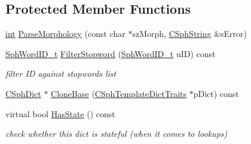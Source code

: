 \subsection*{Protected Member Functions}
\begin{DoxyCompactItemize}
\item 
\hyperlink{sphinxexpr_8cpp_a4a26e8f9cb8b736e0c4cbf4d16de985e}{int} \hyperlink{structCSphTemplateDictTraits_a12ea1c20cfb80f68c8b7248cefb35e87}{Parse\-Morphology} (const char $\ast$sz\-Morph, \hyperlink{structCSphString}{C\-Sph\-String} \&s\-Error)
\item 
\hyperlink{sphinx_8h_a80a94d5984fdf9214a98f3e5e65df963}{Sph\-Word\-I\-D\-\_\-t} \hyperlink{structCSphTemplateDictTraits_a7ab6a1ebada56d16ba82ab3b3cf73cf3}{Filter\-Stopword} (\hyperlink{sphinx_8h_a80a94d5984fdf9214a98f3e5e65df963}{Sph\-Word\-I\-D\-\_\-t} u\-I\-D) const 
\begin{DoxyCompactList}\small\item\em filter I\-D against stopwords list \end{DoxyCompactList}\item 
\hyperlink{classCSphDict}{C\-Sph\-Dict} $\ast$ \hyperlink{structCSphTemplateDictTraits_a3131b3a5d888aa0107c639d32b9d9d51}{Clone\-Base} (\hyperlink{structCSphTemplateDictTraits}{C\-Sph\-Template\-Dict\-Traits} $\ast$p\-Dict) const 
\item 
virtual bool \hyperlink{structCSphTemplateDictTraits_a34465bf3f23a0e95a3fd32746f146b07}{Has\-State} () const 
\begin{DoxyCompactList}\small\item\em check whether this dict is stateful (when it comes to lookups) \end{DoxyCompactList}\end{DoxyCompactItemize}

